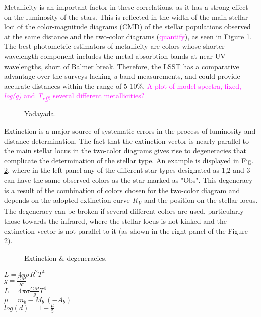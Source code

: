 \documentclass[linenumbers, twocolumn, trackchanges]{aastex631}
\newcommand{\magcom}[1]{\textcolor{magenta}{#1}} %
\begin{document}
Metallicity is an important factor in these correlations, as it has a strong effect on the luminosity of the stars. This is reflected in the width of the main stellar loci of the color-magnitude diagrams (CMD) of the stellar populations observed at the same distance and the two-color diagrams (\magcom{quantify}), as seen in Figure \ref{fig:metallicity}. The best photometric estimators of metallicity are colors whose shorter-wavelength component includes the metal absorbtion bands at near-UV wavelengths, short of Balmer break. Therefore, the LSST has a comparative advantage over the surveys lacking \textit{u}-band measurements, and could provide accurate distances within the range of 5-10\%. \magcom{A plot of model spectra, fixed, \textit{log(g)} and \textit{T\textsubscript{eff}}, several different metallicities?}

\begin{figure}[ht!]
	\caption{Yadayada. \label{fig:metallicity}}
\end{figure}

Extinction is a major source of systematic errors in the process of luminosity and distance determination. The fact that the extinction vector is nearly parallel to the main stellar locus in the two-color diagrams gives rise to degeneracies that complicate the determination of the stellar type. An example is displayed in Fig. \ref{fig:degeneracies}, where in the left panel any of the different star types designated as 1,2 and 3 can have the same observed colors as the star marked as "Obs". This degeneracy is a result of the combination of colors chosen for the two-color diagram and depends on the adopted extinction curve \textit{R\textsubscript{V}} and the position on the stellar locus. The degeneracy can be broken if several different colors are used, particularly those towards the infrared, where the stellar locus is not kinked and the extinction vector is not parallel to it (as shown in the right panel of the Figure \ref{fig:degeneracies}).

\begin{figure}[ht!]
	\caption{Extinction \& degeneracies. \label{fig:degeneracies}}
\end{figure}

$L=4\pi\sigma R^2 T^4$\\
$g = \frac{GM}{R^2}$\\
$L=4\pi \sigma \frac{GM}{g} T^4$\\
$\mu = m_b - M_b {\ }(- A_b)$\\
$log(d) = 1 + \frac{\mu}{5}$\\
\end{document}
